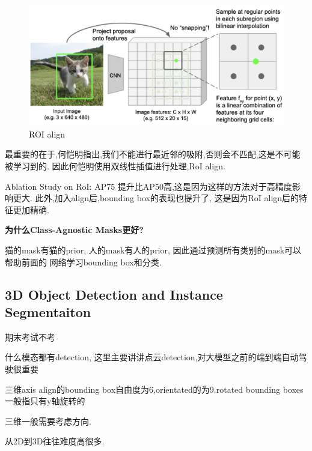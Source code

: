 \begin{figure}[htbp]
    \centering
    \includegraphics[scale=0.3]{figures/ROI_align.png}
    \caption{ROI align}
    \label{fig:ROI_align}
\end{figure}

最重要的在于,何恺明指出,我们不能进行最近邻的吸附,否则会不匹配,这是不可能被学习到的.
因此何恺明使用双线性插值进行处理,RoI align.

Ablation Study on RoI:
AP75 提升比AP50高,这是因为这样的方法对于高精度影响更大.
此外,加入align后,bounding box的表现也提升了, 这是因为RoI align后的特征更加精确.

\textbf{为什么Class-Agnostic Masks更好?}

猫的mask有猫的prior, 人的mask有人的prior, 因此通过预测所有类别的mask可以帮助前面的
网络学习bounding box和分类.

\subsection{3D Object Detection and Instance Segmentaiton}

期末考试不考

什么模态都有detection, 这里主要讲讲点云detection,对大模型之前的端到端自动驾驶很重要

三维axis align的bounding box自由度为6,orientated的为9.rotated bounding boxes
一般指只有y轴旋转的

三维一般需要考虑方向.

从2D到3D往往难度高很多.
